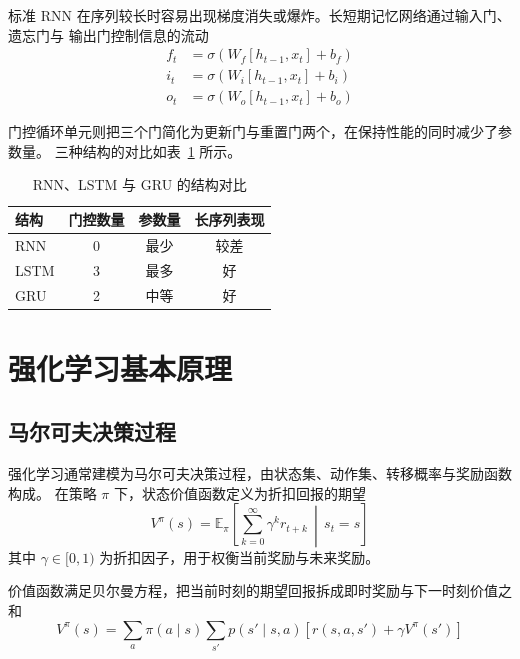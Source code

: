 标准 RNN 在序列较长时容易出现梯度消失或爆炸。长短期记忆网络通过输入门、遗忘门与
输出门控制信息的流动
\begin{equation}
  \begin{aligned}
    f_t &= \sigma\left( W_f \left[ h_{t-1}, x_t \right] + b_f \right) \\
    i_t &= \sigma\left( W_i \left[ h_{t-1}, x_t \right] + b_i \right) \\
    o_t &= \sigma\left( W_o \left[ h_{t-1}, x_t \right] + b_o \right)
  \end{aligned}
  \label{eq:lstm}
\end{equation}

门控循环单元则把三个门简化为更新门与重置门两个，在保持性能的同时减少了参数量。
三种结构的对比如表~\ref{tab:rnn} 所示。

\begin{table}[htbp]
  \centering
  \caption{RNN、LSTM 与 GRU 的结构对比}
  \label{tab:rnn}
  \begin{tabular}{lccc}
    \toprule
    结构 & 门控数量 & 参数量 & 长序列表现 \\
    \midrule
    RNN  & 0 & 最少 & 较差 \\
    LSTM & 3 & 最多 & 好   \\
    GRU  & 2 & 中等 & 好   \\
    \bottomrule
  \end{tabular}
\end{table}

\section{强化学习基本原理}

\subsection{马尔可夫决策过程}

强化学习通常建模为马尔可夫决策过程，由状态集、动作集、转移概率与奖励函数构成。
在策略 $\pi$ 下，状态价值函数定义为折扣回报的期望
\begin{equation}
  V^{\pi}(s) = \mathbb{E}_{\pi}\left[ \sum_{k=0}^{\infty} \gamma^{k} r_{t+k} \,\middle|\, s_t = s \right]
  \label{eq:value}
\end{equation}
其中 $\gamma \in [0,1)$ 为折扣因子，用于权衡当前奖励与未来奖励。

价值函数满足贝尔曼方程，把当前时刻的期望回报拆成即时奖励与下一时刻价值之和
\begin{equation}
  V^{\pi}(s) = \sum_{a} \pi(a \mid s) \sum_{s'} p(s' \mid s, a) \left[ r(s,a,s') + \gamma V^{\pi}(s') \right]
  \label{eq:bellman}
\end{equation}

